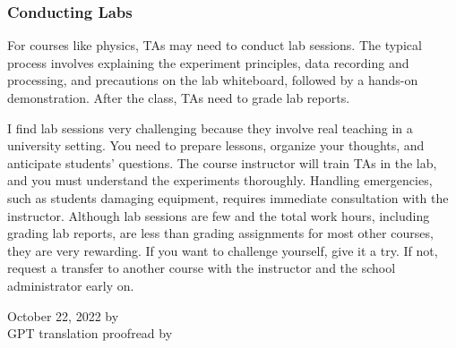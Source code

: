 \subsubsection{Conducting Labs}
\begin{minipage}[t]{0.55\textwidth}
    For courses like physics, TAs may need to conduct lab sessions. The typical process involves explaining the experiment principles, data recording and processing, and precautions on the lab whiteboard, followed by a hands-on demonstration. After the class, TAs need to grade lab reports.

    I find lab sessions very challenging because they involve real teaching in a university setting. You need to prepare lessons, organize your thoughts, and anticipate students' questions. The course instructor will train TAs in the lab, and you must understand the experiments thoroughly. Handling emergencies, such as students damaging equipment, requires immediate consultation with the instructor. Although lab sessions are few and the total work hours, including grading lab reports, are less than grading assignments for most other courses, they are very rewarding. If you want to challenge yourself, give it a try. If not, request a transfer to another course with the instructor and the school administrator early on.
    \begin{flushright}
        October 22, 2022 by \Wu \\
        GPT translation proofread by \Shiyao
    \end{flushright}
\end{minipage}
%
